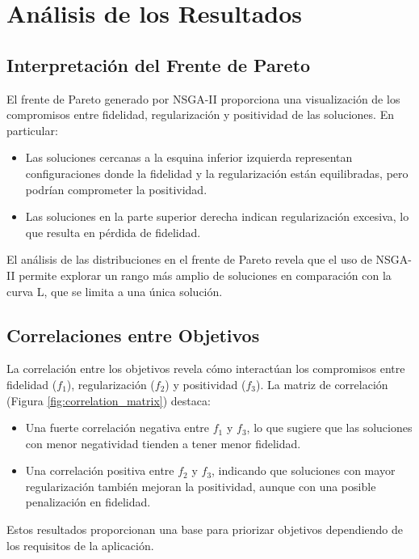 \section{Análisis de los Resultados} \label{sec:analysis}

\subsection{Interpretación del Frente de Pareto} \label{sec:analysis:pareto}
El frente de Pareto generado por NSGA-II proporciona una visualización de los compromisos entre fidelidad, regularización y positividad de las soluciones. En particular:
\begin{itemize}
    \item Las soluciones cercanas a la esquina inferior izquierda representan configuraciones donde la fidelidad y la regularización están equilibradas, pero podrían comprometer la positividad.
    \item Las soluciones en la parte superior derecha indican regularización excesiva, lo que resulta en pérdida de fidelidad.
\end{itemize}

El análisis de las distribuciones en el frente de Pareto revela que el uso de NSGA-II permite explorar un rango más amplio de soluciones en comparación con la curva L, que se limita a una única solución.

\subsection{Correlaciones entre Objetivos} \label{sec:analysis:correlations}
La correlación entre los objetivos revela cómo interactúan los compromisos entre fidelidad (\( f_1 \)), regularización (\( f_2 \)) y positividad (\( f_3 \)). La matriz de correlación (Figura \ref{fig:correlation_matrix}) destaca:
\begin{itemize}
    \item Una fuerte correlación negativa entre \( f_1 \) y \( f_3 \), lo que sugiere que las soluciones con menor negatividad tienden a tener menor fidelidad.
    \item Una correlación positiva entre \( f_2 \) y \( f_3 \), indicando que soluciones con mayor regularización también mejoran la positividad, aunque con una posible penalización en fidelidad.
\end{itemize}

Estos resultados proporcionan una base para priorizar objetivos dependiendo de los requisitos de la aplicación.

